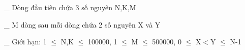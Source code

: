 \_ Dòng đầu tiên chứa 3 số nguyên N,K,M  

   \_ M dòng sau mỗi dòng chứa 2 số nguyên X và Y  

   \_ Giới hạn: 1 $\le$ N,K $\le$ 100000, 1 $\le$ M $\le$ 500000, 0 $\le$ X$<$Y $\le$ N-1  

\